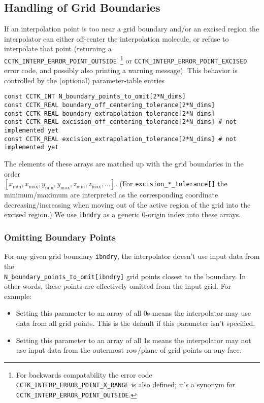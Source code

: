 
\subsection{Handling of Grid Boundaries}
\label{AEIThorns/AEILocalInterp/sect-grid-boundaries}

If an interpolation point is too near a grid boundary and/or an
excised region the interpolator can either off-center the interpolation
molecule, or refuse to interpolate that point
(returning a\\
\verb|CCTK_INTERP_ERROR_POINT_OUTSIDE|\,%
\footnote{%
	 For backwards compatability the error code
	 {\tt CCTK\_INTERP\_ERROR\_POINT\_X\_RANGE}
	 is also defined; it's a synonym for
	 {\tt CCTK\_INTERP\_ERROR\_POINT\_OUTSIDE}.
	 }%
{} or \verb|CCTK_INTERP_ERROR_POINT_EXCISED| error code, and possibly
also printing a warning message).  This behavior is controlled by the
(optional) parameter-table entries
\begin{verbatim}
const CCTK_INT N_boundary_points_to_omit[2*N_dims]
const CCTK_REAL boundary_off_centering_tolerance[2*N_dims]
const CCTK_REAL boundary_extrapolation_tolerance[2*N_dims]
const CCTK_REAL excision_off_centering_tolerance[2*N_dims] # not implemented yet
const CCTK_REAL excision_extrapolation_tolerance[2*N_dims] # not implemented yet
\end{verbatim}
The elements of these arrays are matched up with the grid boundaries
in the order\\
$[x_{\min}, x_{\max}, y_{\min}, y_{\max}, z_{\min}, z_{\max}, \dots]$.
(For \verb|excision_*_tolerance[]| the minimum/maximum are interpreted
as the corresponding coordinate decreasing/increasing when moving
out of the active region of the grid into the excised region.)
We use \verb|ibndry| as a generic 0-origin index into these arrays.


\subsubsection{Omitting Boundary Points}

For any given grid boundary \verb|ibndry|, the interpolator doesn't use
input data from the\\
\verb|N_boundary_points_to_omit[ibndry]| grid points closest to the
boundary.  In other words, these points are effectively omitted from
the input grid.  For example:
\begin{itemize}
\item	Setting this parameter to an array of all 0s means the
	interpolator may use data from all grid points.
	This is the default if this parameter isn't specified.
\item	Setting this parameter to an array of all 1s means the
	interpolator may not use input data from the outermost
	row/plane of grid points on any face.
\end{itemize}

